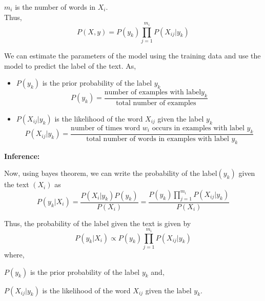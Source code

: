 $m_i$ is the number of words in $X_i$.\\

\noindent Thus, 
$$
	P(X,y) = P(y_k) \prod_{j=1}^{m_i} P(X_{ij}| y_k)
$$

We can estimate the parameters of the model using the training data and use the model to predict the label of the text.
As,
\begin{itemize}
	\item $P(y_k)$ is the prior probability of the label $y_k$ 
	$$ 
		P(y_k) = \frac{\text{number of examples with label} y_k}{\text{total number of examples}}
	$$
	\item $P(X_{ij}| y_k)$ is the likelihood of the word $X_{ij}$ given the label $y_k$
	$$
		P(X_{ij}| y_k) = \frac{\text{number of times word } w_i \text{ occurs in examples with label } y_k}{\text{total number of words in examples with label } y_k}
	$$
\end{itemize}

\noindent\textbf{Inference:}

Now, using bayes theorem, we can write the probability of the label$(y_k)$ given the text $(X_i)$ as 
$$
	P(y_k|X_i) = \frac{P(X_i|y_k)P(y_k)}{P(X_i)} = \frac{P(y_k) \prod_{j=1}^{m_i} P(X_{ij}| y_k)}{P(X_i)}
$$

\vspace{0.5cm}
\noindent Thus, the probability of the label given the text is given by
$$
	P(y_k|X_i) \propto P(y_k) \prod_{j=1}^{m_i} P(X_{ij}| y_k)
$$
\noindent where, 

$P(y_k)$ is the prior probability of the label $y_k$ and,

$P(X_{ij}| y_k)$ is the likelihood of the word $X_{ij}$ given the label $y_k$.

